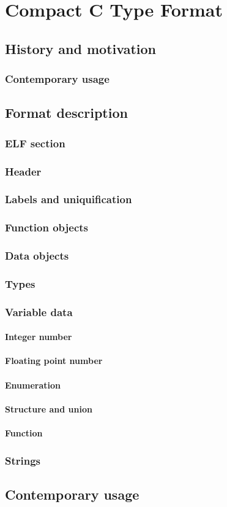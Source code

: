 \chapter{Compact C Type Format}

\section{History and motivation}
\subsection{Contemporary usage}
\section{Format description}
\subsection{ELF section}
\subsection{Header}
\subsection{Labels and uniquification}
\subsection{Function objects}
\subsection{Data objects}
\subsection{Types}
\subsection{Variable data}
\subsubsection{Integer number}
\subsubsection{Floating point number}
\subsubsection{Enumeration}
\subsubsection{Structure and union}
\subsubsection{Function}
\subsection{Strings}
\section{Contemporary usage}

